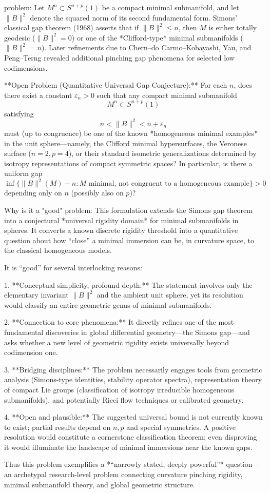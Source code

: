 problem:  
Let \(M^n \subset S^{n+p}(1)\) be a compact minimal submanifold, and let \(\|B\|^2\) denote the squared norm of its second fundamental form.  
Simons’ classical gap theorem (1968) asserts that if \(\|B\|^2 \le n\), then \(M\) is either totally geodesic (\(\|B\|^2 = 0\)) or one of the *Clifford-type* minimal submanifolds (\(\|B\|^2 = n\)). Later refinements due to Chern–do Carmo–Kobayashi, Yau, and Peng–Terng revealed additional pinching gap phenomena for selected low codimensions.  

**Open Problem (Quantitative Universal Gap Conjecture):**  
For each \(n\), does there exist a constant \( \varepsilon_n > 0 \) such that any compact minimal submanifold  
\[
M^n \subset S^{n+p}(1)
\]
satisfying  
\[
n < \|B\|^2 < n + \varepsilon_n
\]
must (up to congruence) be one of the known *homogeneous minimal examples* in the unit sphere—namely, the Clifford minimal hypersurfaces, the Veronese surface (\(n=2, p=4\)), or their standard isometric generalizations determined by isotropy representations of compact symmetric spaces?  
In particular, is there a uniform gap
\[
\inf\{\|B\|^2(M) - n : M\text{ minimal, not congruent to a homogeneous example}\} > 0
\]
depending only on \(n\) (possibly also on \(p\))?  

Why is it a "good" problem:  
This formulation extends the Simons gap theorem into a conjectural *universal rigidity domain* for minimal submanifolds in spheres. It converts a known discrete rigidity threshold into a quantitative question about how “close” a minimal immersion can be, in curvature space, to the classical homogeneous models.  

It is “good” for several interlocking reasons:  

1. **Conceptual simplicity, profound depth:** The statement involves only the elementary invariant \(\|B\|^2\) and the ambient unit sphere, yet its resolution would classify an entire geometric genus of minimal submanifolds.  

2. **Connection to core phenomena:** It directly refines one of the most fundamental discoveries in global differential geometry—the Simons gap—and asks whether a new level of geometric rigidity exists universally beyond codimension one.  

3. **Bridging disciplines:** The problem necessarily engages tools from geometric analysis (Simons-type identities, stability operator spectra), representation theory of compact Lie groups (classification of isotropy irreducible homogeneous submanifolds), and potentially Ricci flow techniques or calibrated geometry.  

4. **Open and plausible:** The suggested universal bound is not currently known to exist; partial results depend on \(n,p\) and special symmetries. A positive resolution would constitute a cornerstone classification theorem; even disproving it would illuminate the landscape of minimal immersions near the known gaps.  

Thus this problem exemplifies a *“narrowly stated, deeply powerful”* question—an archetypal research-level problem connecting curvature pinching rigidity, minimal submanifold theory, and global geometric structure.